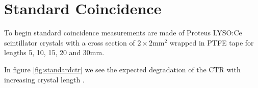 \section{Standard Coincidence}
\label{sec:standardctr}
To begin standard coincidence measurements are made of Proteus LYSO:Ce scintillator crystals with a cross section of $2\times2$mm$^2$ wrapped in PTFE tape for lengths 5, 10, 15, 20 and 30mm. 


In figure \ref{fig:standardctr} we see the expected degradation of the CTR with increasing crystal length \cite{r_Paganoni_Pauwels_et_al__2011}\cite{Wiener_Kaul_Surti_Karp_2010}\cite{Choong_2009}\cite{Gola_Piemonte_Tarolli_2013}\cite{o_Pro_Serra_Tarolli_Zorzi_2011}.